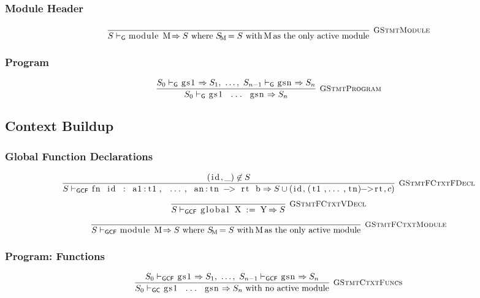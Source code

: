 \documentclass{article}
\newcommand{\code}[1]{\lstinline[columns=fixed]{#1}}
\newcommand{\drmrule}[5]{\frac{#1}{#2\vdash_{\mathsf{#3}}#4}\textsc{\ \small{#5}}}
\newcommand{\ruleapp}[1]{\vdash_{\mathsf{#1}}}
\newcommand{\mc}[1]{\textnormal{\code{#1}}}
\begin{document}
			\subsubsection{Module Header}
			
				\begin{align*}
					\drmrule{}{S}{G}{\mc{module M} \Rightarrow S \textnormal{ where $S_{\mc{M}} = S$ with \code{M} as the only active module}}{GStmtModule}
				\end{align*}
			
			\subsubsection{Program}
			
				\begin{align*}
					\drmrule{S_0 \ruleapp{G} \mc{gs1} \Rightarrow S_1,\ \dots,\ S_{n-1} \ruleapp{G} \mc{gsn} \Rightarrow S_n}{S_0}{G}{\mc{gs1 ... gsn} \Rightarrow S_n}{GStmtProgram}
				\end{align*}
				
		\subsection{Context Buildup}
		
			\subsubsection{Global Function Declarations}
			
				\begin{align*}
					\drmrule{(\mc{id},\_) \not\in S}{S}{GCF}{\mc{fn id : a1:t1, ..., an:tn -> rt b} \Rightarrow S \cup (\mc{id}, \mc{(t1,...,tn)->rt}, c)}{GStmtFCtxtFDecl}
				\end{align*}\begin{align*}
					\drmrule{}{S}{GCF}{\mc{global X := Y} \Rightarrow S}{GStmtFCtxtVDecl}
				\end{align*}\begin{align*}
					\drmrule{}{S}{GCF}{\mc{module M} \Rightarrow S\textnormal{ where $S_{\mc{M}} = S$ with \code{M} as the only active module}}{GStmtFCtxtModule}
				\end{align*}
			
			\subsubsection{Program: Functions}
			
				\begin{align*}
					\drmrule{S_0 \ruleapp{GCF} \mc{gs1} \Rightarrow S_1,\ \dots,\ S_{n-1} \ruleapp{GCF} \mc{gsn} \Rightarrow S_n}{S_0}{GC}{\mc{gs1 ... gsn} \Rightarrow S_n \textnormal{ with no active module}}{GStmtCtxtFuncs}
				\end{align*}
			
\end{document}
